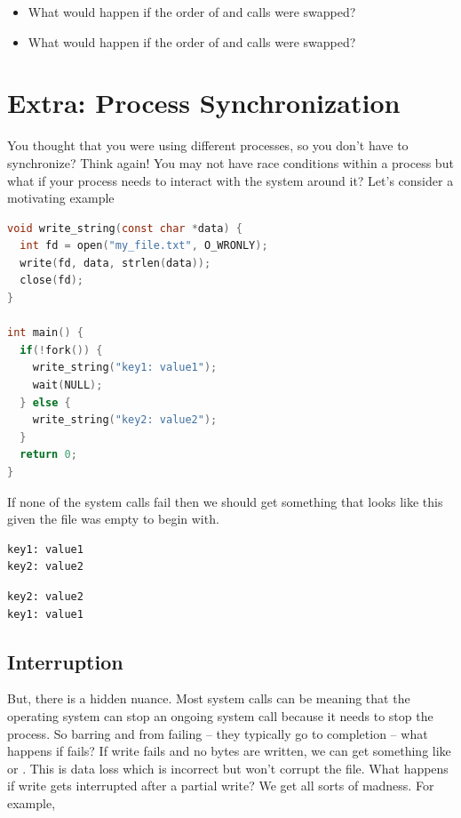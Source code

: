 \begin{itemize}
\tightlist
\item
  What would happen if the order of  and  calls were swapped?
\item
  What would happen if the order of  and  calls were swapped?
\end{itemize}


\section{Extra: Process Synchronization}

You thought that you were using different processes, so you don't have to synchronize?
Think again!
You may not have race conditions within a process but what if your process needs to interact with the system around it?
Let's consider a motivating example

\begin{lstlisting}[language=C]
void write_string(const char *data) {
  int fd = open("my_file.txt", O_WRONLY);
  write(fd, data, strlen(data));
  close(fd);
}

int main() {
  if(!fork()) {
    write_string("key1: value1");
    wait(NULL);
  } else {
    write_string("key2: value2");
  }
  return 0;
}
\end{lstlisting}

If none of the system calls fail then we should get something that looks like this given the file was empty to begin with.

\begin{lstlisting}
key1: value1
key2: value2
\end{lstlisting}

\begin{lstlisting}
key2: value2
key1: value1
\end{lstlisting}

\subsection{Interruption}

But, there is a hidden nuance.
Most system calls can be  meaning that the operating system can stop an ongoing system call because it needs to stop the process.
So barring    and  from failing -- they typically go to completion -- what happens if  fails? If write fails and no bytes are written, we can get something like  or .
This is data loss which is incorrect but won't corrupt the file.
What happens if write gets interrupted after a partial write? We get all sorts of madness.
For example,

